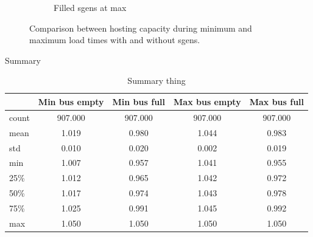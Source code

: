 \documentclass[a4paper,10pt]{report}
\begin{document}
\begin{figure}
\begin{subfigure}[b]{0.475\textwidth}
		\caption[]%
		{{\small Filled sgens at max}}    
		\label{fig:mean and std of net44}
	\end{subfigure}
	\caption[Comparison of hosting capacities for time extremes]
	{\small Comparison between hosting capacity during minimum and maximum load times with and without sgens.} 
	\label{fig:mean and std of nets}
\end{figure}

Summary
\begin{table}[htpb]
	\centering
	\begin{tabular}{lcccc}
		\toprule
		& Min bus empty & Min bus full & Max bus empty & Max bus full \\
		\midrule
		count & 907.000 & 907.000 & 907.000 & 907.000 \\
		mean & 1.019 & 0.980 & 1.044 & 0.983 \\
		std & 0.010 & 0.020 & 0.002 & 0.019 \\
		min & 1.007 & 0.957 & 1.041 & 0.955 \\
		25\% & 1.012 & 0.965 & 1.042 & 0.972 \\
		50\% & 1.017 & 0.974 & 1.043 & 0.978 \\
		75\% & 1.025 & 0.991 & 1.045 & 0.992 \\
		max & 1.050 & 1.050 & 1.050 & 1.050 \\
		\bottomrule
	\end{tabular}
	\caption{Summary thing}
	\label{extremes_summary}
\end{table}
\end{document}
